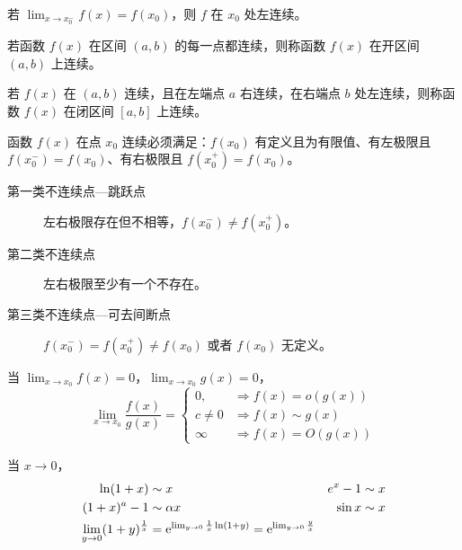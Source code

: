 \documentclass{ctexbook}
\def\e{\textnormal{e}}
\begin{document}
\begin{definition}[单侧连续]
    若 $\lim_{x\rightarrow x_0^-}f(x)=f(x_0)$，则 $f$ 在 $x_0$ 处左连续。
\end{definition}

\begin{definition}[区间连续]
    若函数 $f(x)$ 在区间 $(a,b)$ 的每一点都连续，则称函数 $f(x)$ 在开区间 $(a,b)$ 上连续。

    若 $f(x)$ 在 $(a,b)$ 连续，且在左端点 $a$ 右连续，在右端点 $b$ 处左连续，则称函数 $f(x)$ 在闭区间 $[a,b]$ 上连续。
\end{definition}

\begin{definition}[不连续点]
    函数 $f(x)$ 在点 $x_0$ 连续必须满足：$f(x_0)$ 有定义且为有限值、有左极限且 $f(x_0^-)=f(x_0)$、有右极限且 $f(x_0^+)=f(x_0)$。
    \begin{description}
        \item[第一类不连续点---跳跃点] 左右极限存在但不相等，$f(x_0^-)\neq f(x_0^+)$。
        \item[第二类不连续点] 左右极限至少有一个不存在。
        \item[第三类不连续点---可去间断点] $f(x_0^-)=f(x_0^+)\neq f(x_0)$ 或者 $f(x_0)$ 无定义。  
    \end{description}
\end{definition}

\begin{definition}[无穷小量]
    当 $\lim_{x\rightarrow x_0}f(x)=0$，$\lim_{x\rightarrow x_0}g(x)=0$，
    \begin{equation}
        \lim_{x\rightarrow x_0}\frac{f(x)}{g(x)}=\begin{cases}
            0, &\Rightarrow f(x)=o(g(x))\\
            c\neq 0 &\Rightarrow f(x)\sim g(x)\\
            \infty &\Rightarrow f(x)=O(g(x))
        \end{cases}
    \end{equation}
\end{definition}

\begin{proposition}[常见等价无穷小]
    当 $x\rightarrow 0$，
    \begin{align*}
        \ln(1+x)&\sim x & e^x-1&\sim x \\
        (1+x)^a-1&\sim \alpha x & \sin x &\sim x\\
        \lim_{y\rightarrow 0}(1+y)^{\frac{1}{x}} &= \e^{\lim_{y\rightarrow 0}\frac{1}{x}\ln(1+y)}=\e^{\lim_{y\rightarrow 0}\frac{y}{x}}
    \end{align*}
\end{proposition}
\end{document}
